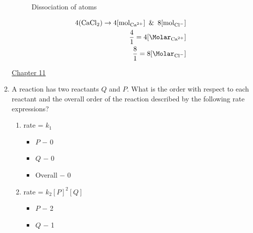 \documentclass[12pt]{article}
\begin{document}
\begin{enumerate}
      \begin{figure}[h]
        \centering
        
        \caption{Dissociation of  atoms}
        \label{fig:1}
      \end{figure}

      \begin{equation}
        \begin{split}
          4(\ce{CaCl2})\rightarrow4[\si{\mole}_{\ce{Ca^2+}}]\,\,\,\&\,\,\,8[\si{\mole}_{\ce{Cl-}}]\\
          \frac{4}{1}=4[\si{\Molar}_{\ce{Ca^2+}}]\\
          \frac{8}{1}=8[\si{\Molar}_{\ce{Cl-}}]\\
        \end{split}
        \label{1}
      \end{equation}

      \newpage

    \begin{center}
      \underline{Chapter 11}
    \end{center}

    \setcounter{enumi}{11}

  \item A reaction has two reactants $Q$ and $P$. What is the order with respect to each reactant and the overall order of the reaction described by the following rate expressions?

    \begin{enumerate}

      \item rate = $k_1$

        \begin{itemize}

          \item $P$ $-$ 0

          \item $Q$ $-$ 0

          \item Overall $-$ 0

        \end{itemize}

      \item rate = $k_2[P]^2[Q]$

        \begin{itemize}

          \item $P$ $-$ 2

          \item $Q$ $-$ 1


\end{itemize}
\end{enumerate}
\end{enumerate}
\end{document}
